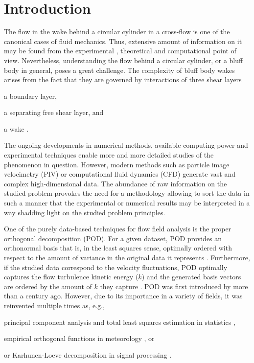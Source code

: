 \clearpage
\section{Introduction}
\label{sec:intro}
The flow in the wake behind a circular cylinder in a cross-flow is one of the canonical cases of fluid mechanics. Thus, extensive amount of information on it may be found from the experimental \citep{kovasznay1949,roshko1953,roshko1955,tritton1959,tyler1931,relf1925,relf1921,norberg1994,wieselsberger1921,lienhard1966,jordan1972,williamson1989,williamson1996,prasad1997}, theoretical \citep{schatzmann1981,saffman1982,crowdy2017,williamson1996} and computational \citep{braza1986,sirisup2004,henderson1995,fiabane2011} point of view. Nevertheless, understanding the flow behind a circular cylinder, or a bluff body in general, poses a great challenge. The complexity of bluff body wakes arises from the fact that they are governed by interactions of three shear layers
\begin{inparaenum}[(i)]
        \item a boundary layer,
        \item a separating free shear layer, and
        \item a wake \citep{williamson1996}. 
\end{inparaenum}

The ongoing developments in numerical methods, available computing power and experimental techniques enable more and more detailed studies of the phenomenon in question. However, modern methods such as particle image velocimetry (PIV) or computational fluid dynamics (CFD) generate vast and complex high-dimensional data. The abundance of raw information on the studied problem provokes the need for a methodology allowing to sort the data in {such} a manner {that} the experimental or numerical results may be interpreted in a way shadding light on the studied problem principles.

One of the purely data-based techniques for flow field analysis is the proper orthogonal decomposition (POD). For a given dataset, POD provides an orthonormal basis that is, in the least squares sense, optimally ordered with respect to the amount of variance in the original data it represents \citep{isoz2019}. Furthermore, if the studied data correspond to the velocity fluctuations, POD optimally captures the flow turbulence kinetic energy ($k$) and the generated basis vectors are ordered by the amount of $k$ they capture \citep{taira2020}. POD was first introduced by \citet{Pearson1901} more than a century ago. However, due to its importance in a variety of fields, it was reinvented multiple times as, e.g., 
\begin{inparaenum}[(i)]
        \item principal component analysis \citep{hoetelling1935,jollife2014} and total least squares estimation in statistics \citep{vanHuffel2013,schaffrin2006,leyang2012},
        \item empirical orthogonal functions in meteorology \citep{lorenzxy}, or
        \item or Karhunen-Loeve decomposition in signal processing \citep{karhunen1946,loeve1946}. 
\end{inparaenum}

